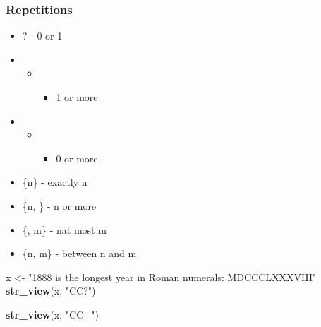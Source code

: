 \documentclass[
]{article}
\newenvironment{Shaded}{\begin{snugshade}}{\end{snugshade}}
\newcommand{\KeywordTok}[1]{\textcolor[rgb]{0.13,0.29,0.53}{\textbf{#1}}}
\newcommand{\NormalTok}[1]{#1}
\newcommand{\StringTok}[1]{\textcolor[rgb]{0.31,0.60,0.02}{#1}}
\providecommand{\tightlist}{%
  \setlength{\itemsep}{0pt}\setlength{\parskip}{0pt}}
\begin{document}
\hypertarget{htmlwidget-4386ebb57fc6dda7dce5}{}
\begin{str_view}

\end{str_view}

\hypertarget{repetitions}{%
\subsubsection{Repetitions}\label{repetitions}}

\begin{itemize}
\item
  ? - 0 or 1
\item
  \begin{itemize}
  \item
    \begin{itemize}
    \tightlist
    \item
      1 or more
    \end{itemize}
  \end{itemize}
\item
  \begin{itemize}
  \item
    \begin{itemize}
    \tightlist
    \item
      0 or more
    \end{itemize}
  \end{itemize}
\item
  \{n\} - exactly n
\item
  \{n, \} - n or more
\item
  \{, m\} - nat most m
\item
  \{n, m\} - between n and m
\end{itemize}

\begin{Shaded}
\begin{Highlighting}[]
\NormalTok{x \textless{}{-}}\StringTok{ "1888 is the longest year in Roman numerals: MDCCCLXXXVIII"}
\KeywordTok{str\_view}\NormalTok{(x, }\StringTok{"CC?"}\NormalTok{)}
\end{Highlighting}
\end{Shaded}

\hypertarget{htmlwidget-467010902a47193833a3}{}
\begin{str_view}

\end{str_view}

\begin{Shaded}
\begin{Highlighting}[]
\KeywordTok{str\_view}\NormalTok{(x, }\StringTok{"CC+"}\NormalTok{)}
\end{Highlighting}
\end{Shaded}
\end{document}
